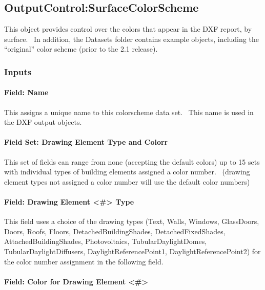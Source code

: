 \subsection{OutputControl:SurfaceColorScheme}\label{outputcontrolsurfacecolorscheme}

This object provides control over the colors that appear in the DXF report, by surface.~ In addition, the Datasets folder contains example objects, including the ``original'' color scheme (prior to the 2.1 release).

\subsubsection{Inputs}\label{inputs-6-021}

\paragraph{Field: Name}\label{field-name-039}

This assigns a unique name to this colorscheme data set.~ This name is used in the DXF output objects.

\paragraph{Field Set: Drawing Element Type and Colorr}\label{field-set-drawing-element-type-and-colorr}

This set of fields can range from none (accepting the default colors) up to 15 sets with individual types of building elements assigned a color number.~ (drawing element types not assigned a color number will use the default color numbers)

\paragraph{Field: Drawing Element \textless{}\#\textgreater{} Type}\label{field-drawing-element-type}

This field uses a choice of the drawing types (Text, Walls, Windows, GlassDoors, Doors, Roofs, Floors, DetachedBuildingShades, DetachedFixedShades, AttachedBuildingShades, Photovoltaics, TubularDaylightDomes, TubularDaylightDiffusers, DaylightReferencePoint1, DaylightReferencePoint2) for the color number assignment in the following field.

\paragraph{Field: Color for Drawing Element \textless{}\#\textgreater{}}\label{field-color-for-drawing-element}

